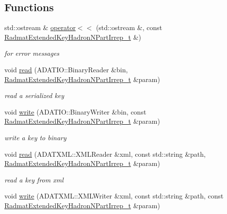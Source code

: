 \subsection*{Functions}
\begin{DoxyCompactItemize}
\item 
std\+::ostream \& \mbox{\hyperlink{namespaceradmat_a452f967dd14ae6fc0f7f9aa7ba04f8a0}{operator$<$$<$}} (std\+::ostream \&, const \mbox{\hyperlink{structradmat_1_1RadmatExtendedKeyHadronNPartIrrep__t}{Radmat\+Extended\+Key\+Hadron\+N\+Part\+Irrep\+\_\+t}} \&)
\begin{DoxyCompactList}\small\item\em for error messages \end{DoxyCompactList}\item 
void \mbox{\hyperlink{namespaceradmat_a99ffeb2977d9d4a90de6b401be74526c}{read}} (A\+D\+A\+T\+I\+O\+::\+Binary\+Reader \&bin, \mbox{\hyperlink{structradmat_1_1RadmatExtendedKeyHadronNPartIrrep__t}{Radmat\+Extended\+Key\+Hadron\+N\+Part\+Irrep\+\_\+t}} \&param)
\begin{DoxyCompactList}\small\item\em read a serialized key \end{DoxyCompactList}\item 
void \mbox{\hyperlink{namespaceradmat_a2ca0177bbaa4c0cfe7505fd997dae1f1}{write}} (A\+D\+A\+T\+I\+O\+::\+Binary\+Writer \&bin, const \mbox{\hyperlink{structradmat_1_1RadmatExtendedKeyHadronNPartIrrep__t}{Radmat\+Extended\+Key\+Hadron\+N\+Part\+Irrep\+\_\+t}} \&param)
\begin{DoxyCompactList}\small\item\em write a key to binary \end{DoxyCompactList}\item 
void \mbox{\hyperlink{namespaceradmat_ac62d85f3d4d74fc2ca2dc2536a8558fa}{read}} (A\+D\+A\+T\+X\+M\+L\+::\+X\+M\+L\+Reader \&xml, const std\+::string \&path, \mbox{\hyperlink{structradmat_1_1RadmatExtendedKeyHadronNPartIrrep__t}{Radmat\+Extended\+Key\+Hadron\+N\+Part\+Irrep\+\_\+t}} \&param)
\begin{DoxyCompactList}\small\item\em read a key from xml \end{DoxyCompactList}\item 
void \mbox{\hyperlink{namespaceradmat_adaf52a8cd9ebda9a7d68fbe9f69d20a9}{write}} (A\+D\+A\+T\+X\+M\+L\+::\+X\+M\+L\+Writer \&xml, const std\+::string \&path, const \mbox{\hyperlink{structradmat_1_1RadmatExtendedKeyHadronNPartIrrep__t}{Radmat\+Extended\+Key\+Hadron\+N\+Part\+Irrep\+\_\+t}} \&param)

\end{DoxyCompactItemize}
